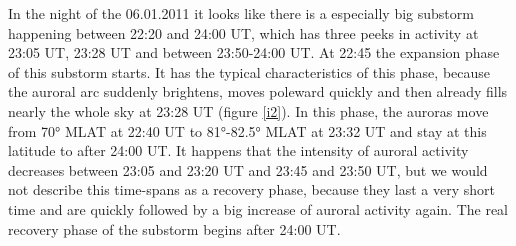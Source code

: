 \documentclass[10pt,a4paper]{article}
\begin{document}
 In the night of the 06.01.2011 it looks like there is a especially big substorm happening between 22:20 and 24:00 UT, which has three peeks in activity at 23:05 UT, 23:28 UT and between 23:50-24:00 UT. At 22:45 the expansion phase of this substorm starts. It has the typical characteristics of this phase, because the auroral arc suddenly brightens, moves poleward quickly and then already fills nearly the whole sky at 23:28 UT (figure \ref{i2}). In this phase, the auroras move from 70° MLAT at 22:40 UT to 81°-82.5° MLAT at 23:32 UT and stay at this latitude to after 24:00 UT. It happens that the intensity of auroral activity decreases between 23:05 and 23:20 UT and 23:45 and 23:50 UT, but we would not describe this time-spans as a recovery phase, because they last a very short time and are quickly followed by a big increase of auroral activity again. The real recovery phase of the substorm begins after 24:00 UT.   
\end{document}
